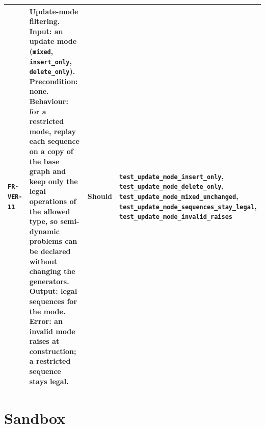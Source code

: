 \begin{longtable}{@{}>{\raggedright\arraybackslash}p{}>{\raggedright\arraybackslash}p{}p{}>{\raggedright\arraybackslash}p{}@{}}
\texttt{FR-VER-11} & \textbf{Update-mode filtering.} Input: an update mode
(\texttt{mixed}, \texttt{insert\_only}, \texttt{delete\_only}). Precondition:
none. Behaviour: for a restricted mode, replay each sequence on a copy of the base
graph and keep only the legal operations of the allowed type, so semi-dynamic
problems can be declared without changing the generators. Output: legal sequences
for the mode. Error: an invalid mode raises at construction; a restricted sequence
stays legal. & Should & \texttt{test\_update\_mode\_insert\_only},
\texttt{test\_update\_mode\_delete\_only},
\texttt{test\_update\_mode\_mixed\_unchanged},
\texttt{test\_update\_mode\_sequences\_stay\_legal},
\texttt{test\_update\_mode\_invalid\_raises} \\
\bottomrule
\end{longtable}

\section{Sandbox}
\label{sec:fr-sbx}

